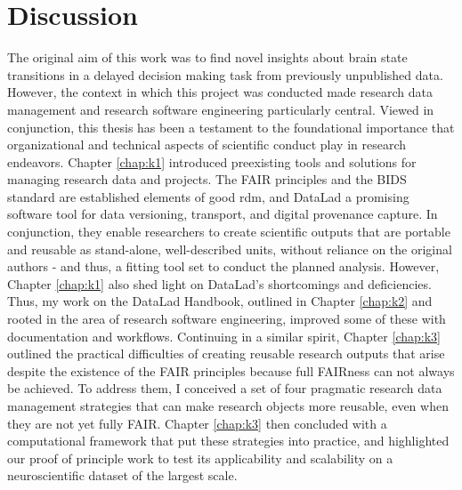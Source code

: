 

\chapter{Discussion}
\label{discussion}

The original aim of this work was to find novel insights about brain state transitions in a delayed decision making task from previously unpublished data.
However, the context in which this project was conducted made research data management and research software engineering particularly central.
Viewed in conjunction, this thesis has been a testament to the foundational importance that organizational and technical aspects of scientific conduct play in research endeavors.
Chapter \ref{chap:k1} introduced preexisting tools and solutions for managing research data and projects.
The \gls{FAIR} principles and the \gls{BIDS} standard are established elements of good \gls{rdm}, and DataLad a promising software tool for data versioning, transport, and digital provenance capture.
In conjunction, they enable researchers to create scientific outputs that are portable and reusable as stand-alone, well-described units, without reliance on the original authors - and thus, a fitting tool set to conduct the planned analysis.
However, Chapter \ref{chap:k1} also shed light on DataLad's shortcomings and deficiencies.
Thus, my work on the DataLad Handbook, outlined in Chapter \ref{chap:k2} and rooted in the area of research software engineering, improved some of these with documentation and workflows.
Continuing in a similar spirit, Chapter \ref{chap:k3} outlined the practical difficulties of creating reusable research outputs that arise despite the existence of the \gls{FAIR} principles because full FAIRness can not always be achieved.
To address them, I conceived a set of four pragmatic research data management strategies that can make research objects more reusable, even when they are not yet fully \gls{FAIR}.
Chapter \ref{chap:k3} then concluded with a computational framework that put these strategies into practice, and highlighted our proof of principle work to test its applicability and scalability on a neuroscientific dataset of the largest scale.


